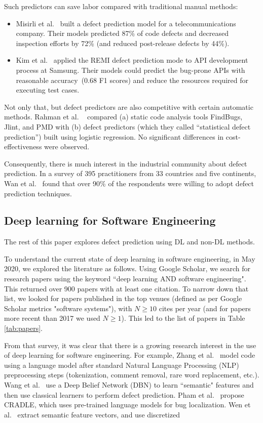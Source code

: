 \documentclass[10pt,compsoc,twocolumn]{IEEEtran}
\begin{document}
Such predictors can save labor compared with traditional manual methods:
\begin{itemize}
\item
Misirli et al.~\cite{misirli2011ai} built a defect prediction model for a telecommunications company. Their models predicted 87\% of code defects and decreased inspection efforts by 72\% (and reduced post-release defects by 44\%). 
\item
Kim et al.~\cite{kim2015remi} applied the REMI
defect prediction mode to   API development process at Samsung.
Their models could
predict the bug-prone APIs with reasonable accuracy~(0.68 F1 scores) and reduce the resources required for executing test cases. 
\end{itemize}
Not only that, but defect predictors  are also competitive with certain automatic methods. 
Rahman et al. ~\cite{rahman2014comparing} compared (a) static code analysis tools FindBugs, Jlint, and PMD with (b) defect predictors (which they called ``statistical defect prediction'') built using logistic regression.
No significant differences in cost-effectiveness were observed.

Consequently,
there is much  interest in the  industrial community about defect prediction.
In  a  survey  of  395  practitioners  from  33  countries  and five  continents,  Wan  et  al.~\cite{wan2018perceptions} found  that  over  90\%  of the  respondents  were  willing  to  adopt  defect  prediction techniques.

\subsection{ Deep learning for Software Engineering}
The rest of this paper explores defect prediction
using DL and non-DL methods.

To understand the current state of deep learning in software engineering, in May 2020,
we explored the literature as follows.
Using Google Scholar, we search for research papers using the keyword ``deep learning AND software engineering". This returned over 900 papers with at least one citation.  
To narrow down that list, we looked for papers   published in the top venues (defined as per   Google Scholar metrics "software systems"),  with $N\ge 10$ cites per year (and for papers
more recent than 2017  we used $N \ge 1$).  This led to the list of papers in Table \ref{tab:papers}.

From that survey, it was clear that 
there is   a growing research interest in the use of deep learning for software engineering. For example, Zhang et al.~\cite{zhang2018neural} model code using a language model after standard Natural Language Processing (NLP) preprocessing steps (tokenization, comment removal, rare word replacement, etc.).
 Wang et al.~\cite{wang2018deep,wang2016automatically} use a Deep Belief Network (DBN) to learn ``semantic" features and then use classical learners to perform defect prediction. Pham et al.~\cite{pham2019cradle} propose CRADLE, which uses pre-trained language models for bug localization. Wen et al.~\cite{wen2018well} extract semantic feature vectors, and use discretized
\end{document}
